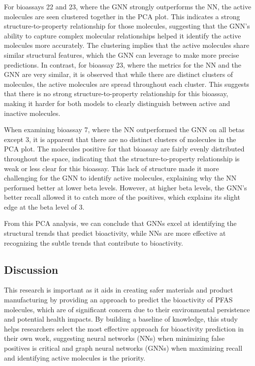 \documentclass[10pt,twocolumn]{article}
\begin{document}
For bioassays 22 and 23, where the GNN strongly outperforms the NN, the active molecules are seen clustered together in the PCA plot. This indicates a strong structure-to-property relationship for those molecules, suggesting that the GNN’s ability to capture complex molecular relationships helped it identify the active molecules more accurately. The clustering implies that the active molecules share similar structural features, which the GNN can leverage to make more precise predictions.
In contrast, for bioassay 23, where the metrics for the NN and the GNN are very similar, it is observed that while there are distinct clusters of molecules, the active molecules are spread throughout each cluster. This suggests that there is no strong structure-to-property relationship for this bioassay, making it harder for both models to clearly distinguish between active and inactive molecules. 

When examining bioassay 7, where the NN outperformed the GNN on all betas except 3, it is apparent that there are no distinct clusters of molecules in the PCA plot. The molecules positive for that bioassay are fairly evenly distributed throughout the space, indicating that the structure-to-property relationship is weak or less clear for this bioassay. This lack of structure made it more challenging for the GNN to identify active molecules, explaining why the NN performed better at lower beta levels. However, at higher beta levels, the GNN’s better recall allowed it to catch more of the positives, which explains its slight edge at the beta level of 3.

From this PCA analysis, we can conclude that GNNs excel at identifying the structural trends that predict bioactivity, while NNs are more effective at recognizing the subtle trends that contribute to bioactivity. 

\subsection{Discussion}

This research is important as it aids in creating safer materials and product manufacturing by providing an approach to predict the bioactivity of PFAS molecules, which are of significant concern due to their environmental persistence and potential health impacts. By building a baseline of knowledge, this study helps researchers select the most effective approach for bioactivity prediction in their own work, suggesting neural networks (NNs) when minimizing false positives is critical and graph neural networks (GNNs) when maximizing recall and identifying active molecules is the priority.
\end{document}
